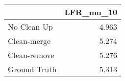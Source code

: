 \begin{tabular}{lr}
\toprule
{} & LFR_mu_10 \\
\midrule
No Clean Up  &     4.963 \\
Clean-merge  &     5.274 \\
Clean-remove &     5.276 \\
Ground Truth &     5.313 \\
\bottomrule
\end{tabular}
